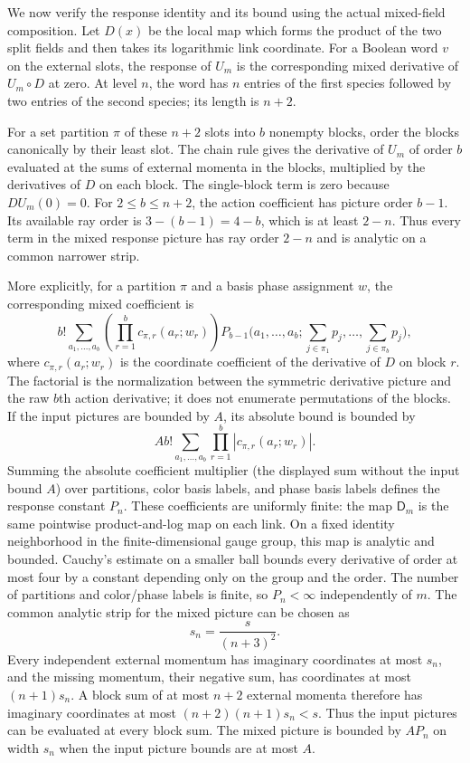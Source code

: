 We now verify the response identity and its bound using the actual
mixed-field composition. Let $D(x)$ be the local map which forms the
product of the two split fields and then takes its logarithmic link
coordinate. For a Boolean word $v$ on the external slots, the response
of $U_m$ is the corresponding mixed derivative of $U_m\circ D$ at zero.
At level $n$, the word has $n$ entries of the first species followed by
two entries of the second species; its length is $n+2$.

For a set partition $\pi$ of these $n+2$ slots into $b$ nonempty blocks,
order the blocks canonically by their least slot. The chain rule gives
the derivative of $U_m$ of order $b$ evaluated at the sums of external
momenta in the blocks, multiplied by the derivatives of $D$ on each
block. The single-block term is zero because $DU_m(0)=0$. For
$2\leq b\leq n+2$, the action coefficient has picture order $b-1$.
Its available ray order is $3-(b-1)=4-b$, which is at least
$2-n$. Thus every term in the mixed response picture has ray order
$2-n$ and is analytic on a common narrower strip.

More explicitly, for a partition $\pi$ and a basis phase assignment $w$,
the corresponding mixed coefficient is
\[
 b!\sum_{a_1,\ldots,a_b}
       \left(\prod_{r=1}^{b}c_{\pi,r}(a_r;w_r)\right)
       P_{b-1}\bigl(a_1,\ldots,a_b;
            \textstyle\sum_{j\in \pi_1}p_j,\ldots,
                      \sum_{j\in \pi_b}p_j\bigr),
\]
where $c_{\pi,r}(a_r;w_r)$ is the coordinate coefficient of the derivative
of $D$ on block $r$. The factorial is the normalization between the
symmetric derivative picture and the raw $b$th action derivative; it does
not enumerate permutations of the blocks. If the input pictures are
bounded by $A$, its absolute bound is
bounded by
\[
 A b!\sum_{a_1,\ldots,a_b}
       \prod_{r=1}^{b}|c_{\pi,r}(a_r;w_r)|.
\]
Summing the absolute coefficient multiplier (the displayed sum without
the input bound $A$) over partitions, color basis labels, and phase basis
labels defines the response constant $P_n$.
These coefficients are uniformly finite: the map $\mathsf D_m$ is the
same pointwise product-and-log map on each link. On a fixed identity
neighborhood in the finite-dimensional gauge group, this map is analytic
and bounded. Cauchy's estimate on a smaller ball bounds every derivative
of order at most four by a constant depending only on the group and the
order. The number of partitions and color/phase labels is finite, so
$P_n<\infty$ independently of $m$.
The common analytic strip for the mixed picture can be chosen as
\[
       s_n=\frac{s}{(n+3)^2}.
\]
Every independent external momentum has imaginary coordinates at most
$s_n$, and the missing momentum, their negative sum, has coordinates at
most $(n+1)s_n$. A block sum of at most $n+2$ external momenta therefore
has imaginary coordinates at most $(n+2)(n+1)s_n<s$. Thus the input
pictures can be evaluated at every block sum. The mixed picture is
bounded by $A P_n$ on width $s_n$ when the input picture bounds are at
most $A$.

